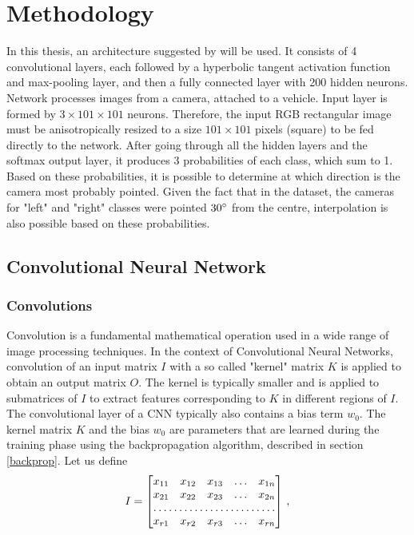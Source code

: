\chapter{Methodology}

In this thesis, an architecture suggested by \citeauthor{giusti2016machine} \cite{giusti2016machine} will be used. It consists of 4 convolutional layers, each followed by a hyperbolic tangent activation function and max-pooling layer, and then a fully connected layer with 200 hidden neurons. Network processes images from a camera, attached to a vehicle. Input layer is formed by $3\times 101\times101$ neurons. Therefore, the input \acs{RGB} rectangular image must be anisotropically resized to a size $101\times101$ pixels (square) to be fed directly to the network. After going through all the hidden layers and the softmax output layer, it produces 3 probabilities of each class, which sum to 1. Based on these probabilities, it is possible to determine at which direction is the camera most probably pointed. Given the fact that in the dataset, the cameras for "left" and "right" classes were pointed $30 \degree$ from the centre, interpolation is also possible based on these probabilities.  


\section{Convolutional Neural Network}
\subsection{Convolutions}

Convolution is a fundamental mathematical operation used in a wide range of image processing techniques. In the context of Convolutional Neural Networks, convolution of an input matrix $I$ with a so called "kernel" matrix $K$ is applied to obtain an output matrix $O$. The kernel is typically smaller and is applied to submatrices of $I$ to extract features corresponding to $K$ in different regions of $I$. The convolutional layer of a \acs{CNN} typically also contains a bias term $w_0$. The kernel matrix $K$ and the bias $w_0$ are parameters that are learned during the training phase using the backpropagation algorithm, described in section \ref{backprop}. Let us define
\begin{equation}
	I = \begin{bmatrix}
    x_{11}       & x_{12} & x_{13} & \dots & x_{1n} \\
    x_{21}       & x_{22} & x_{23} & \dots & x_{2n} \\
    \hdotsfor{5} \\
    x_{r1}       & x_{r2} & x_{r3} & \dots & x_{rn}
\end{bmatrix}\,,
\label{Input data}
\end{equation}

